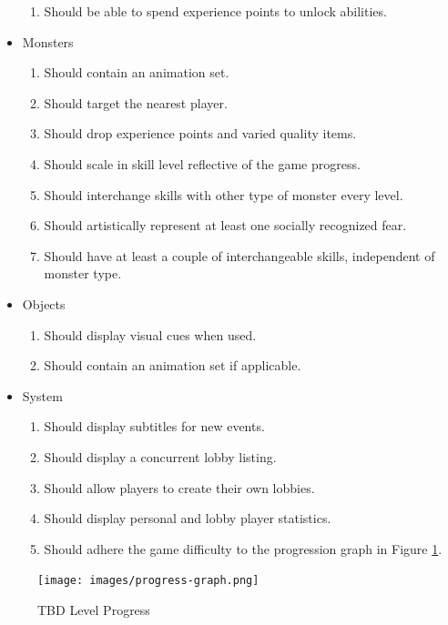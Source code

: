 \documentclass[a4paper,11pt]{article}
\begin{document}
\begin{itemize}
\begin{enumerate}
        \item Should be able to spend experience points to unlock abilities.
    \end{enumerate}
    \item Monsters
    \begin{enumerate}
        \item Should contain an animation set.
        \item Should target the nearest player.
        \item Should drop experience points and varied quality items.
        \item Should scale in skill level reflective of the game progress.
        \item Should interchange skills with other type of monster every level.
        \item Should artistically represent at least one socially recognized fear.
        \item Should have at least a couple of interchangeable skills, independent of monster type.
    \end{enumerate}
    \item Objects
    \begin{enumerate}
        \item Should display visual cues when used.
        \item Should contain an animation set if applicable.
    \end{enumerate}
    \item System
    \begin{enumerate}
        \item Should display subtitles for new events.
        \item Should display a concurrent lobby listing.
        \item Should allow players to create their own lobbies.
        \item Should display personal and lobby player statistics.
        \item Should adhere the game difficulty to the progression graph in Figure \ref{fig:progress-graph}.
    \end{enumerate}
\end{itemize}
\begin{figure}
    \centering
    \texttt{[image: images/progress-graph.png]}
    \caption{TBD Level Progress}
    \label{fig:progress-graph}
\end{figure}
\end{document}
